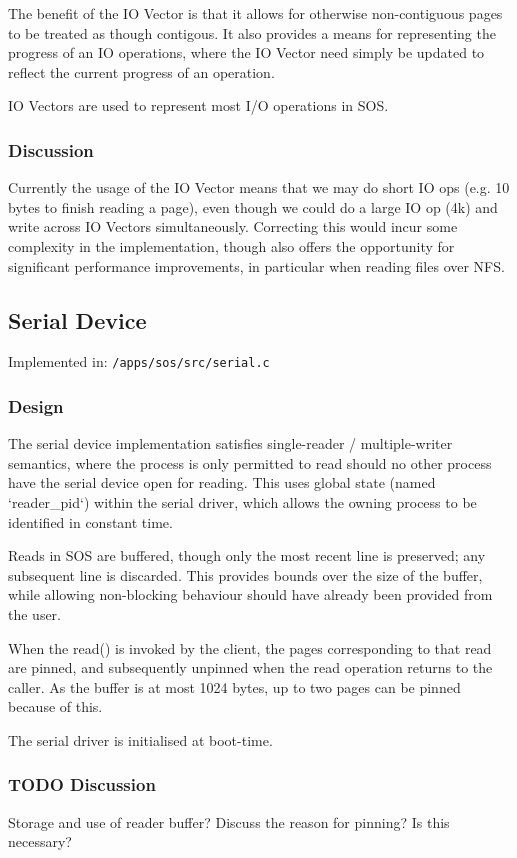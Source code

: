 \documentclass[a4paper,12pt]{article}
\begin{document}
The benefit of the IO Vector is that it allows for otherwise non-contiguous
pages to be treated as though contigous.  It also provides a means for
representing the progress of an IO operations, where the IO Vector need simply
be updated to reflect the current progress of an operation.

IO Vectors are used to represent most I/O operations in SOS.

\subsubsection{Discussion}
Currently the usage of the IO Vector means that we may do short IO ops
(e.g. 10 bytes to finish reading a page), even though we could do a large IO
op (4k) and write across IO Vectors simultaneously.  Correcting this would
incur some complexity in the implementation, though also offers the
opportunity for significant performance improvements, in particular when
reading files over NFS.

\subsection{Serial Device}
Implemented in: \texttt{/apps/sos/src/serial.c}

\subsubsection{Design}
The serial device implementation satisfies single-reader / multiple-writer
semantics, where the process is only permitted to read should no other process
have the serial device open for reading.  This uses global state (named
`reader\_pid`) within the serial driver, which allows the owning process to be
identified in constant time.

Reads in SOS are buffered, though only the most recent line is preserved; any
subsequent line is discarded.  This provides bounds over the size of the
buffer, while allowing non-blocking behaviour should have already been
provided from the user.

When the read() is invoked by the client, the pages corresponding to that read
are pinned, and subsequently unpinned when the read operation returns to the
caller.  As the buffer is at most 1024 bytes, up to two pages can be pinned
because of this.

The serial driver is initialised at boot-time.

\subsubsection{TODO Discussion}
Storage and use of reader buffer?  Discuss the reason for pinning?  Is this necessary?
\end{document}
